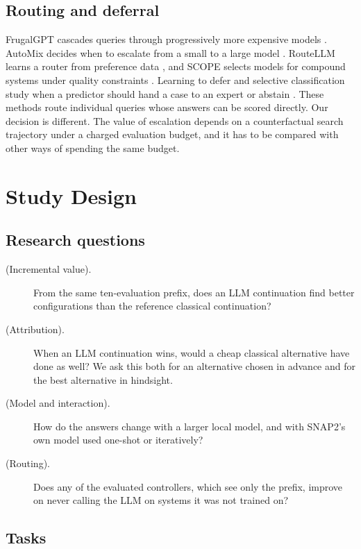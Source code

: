 \subsection{Routing and deferral}

FrugalGPT cascades queries through progressively more expensive models \cite{chen2023frugalgpt}. AutoMix decides when to escalate from a small to a large model \cite{aggarwal2023automix}. RouteLLM learns a router from preference data \cite{ong2024routellm}, and SCOPE selects models for compound systems under quality constraints \cite{huang2026scope}. Learning to defer and selective classification study when a predictor should hand a case to an expert or abstain \cite{mozannar2020defer,geifman2017selective}. These methods route individual queries whose answers can be scored directly. Our decision is different. The value of escalation depends on a counterfactual search trajectory under a charged evaluation budget, and it has to be compared with other ways of spending the same budget.

\section{Study Design}

\subsection{Research questions}

\begin{description}
  \item[ (Incremental value).] From the same ten-evaluation prefix, does an LLM continuation find better configurations than the reference classical continuation?
  \item[ (Attribution).] When an LLM continuation wins, would a cheap classical alternative have done as well? We ask this both for an alternative chosen in advance and for the best alternative in hindsight.
  \item[ (Model and interaction).] How do the answers change with a larger local model, and with SNAP2's own model used one-shot or iteratively?
  \item[ (Routing).] Does any of the evaluated controllers, which see only the prefix, improve on never calling the LLM on systems it was not trained on?
\end{description}

\subsection{Tasks}

